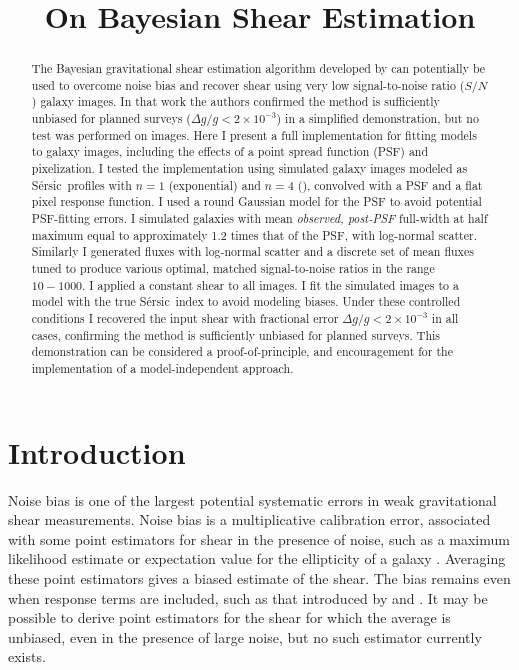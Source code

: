 \documentclass[12pt,preprint]{aastex}
\newcommand{\sn}{$S/N$}
\newcommand{\sersic}{S\'{e}rsic}
\begin{document}
\title{On Bayesian Shear Estimation}



\begin{abstract}

The Bayesian gravitational shear estimation algorithm developed by \cite{ba14}
can potentially be used to overcome noise bias and recover shear using very low
signal-to-noise ratio (\sn) galaxy images.  In that work the authors confirmed
the method is sufficiently unbiased for planned surveys ($\Delta g/g < 2 \times
10^{-3}$) in a simplified demonstration, but no test was performed on images.
Here I present a full implementation for fitting models to galaxy images,
including the effects of a point spread function (PSF) and pixelization.  I
tested the implementation using simulated galaxy images modeled as \sersic\
profiles with $n=1$ (exponential) and $n=4$ (\devauc), convolved with a PSF and
a flat pixel response function.  I used a round Gaussian model for the PSF to
avoid potential PSF-fitting errors. I simulated galaxies with mean {\it
observed, post-PSF} full-width at half maximum equal to approximately 1.2 times
that of the PSF, with log-normal scatter.  Similarly I generated fluxes with
log-normal scatter and a discrete set of mean fluxes tuned to produce various
optimal, matched signal-to-noise ratios in the range $10-1000$.  I applied a
constant shear to all images. I fit the simulated images to a model with the
true \sersic\ index to avoid modeling biases.   Under these controlled
conditions I recovered the input shear with fractional error $\Delta g/g < 2
\times 10^{-3}$ in all cases, confirming the method is sufficiently unbiased
for planned surveys.  This demonstration can be considered a
proof-of-principle, and encouragement for the implementation of a
model-independent approach.


\end{abstract}

\section{Introduction} \label{sec:intro}


Noise bias is one of the largest potential systematic errors in weak
gravitational shear measurements.  Noise bias is a multiplicative calibration
error, associated with some point estimators for shear in the presence of
noise, such as a maximum likelihood estimate or expectation value for the
ellipticity of a galaxy \citep{HirataAlign04,Refreg12,Melchior12,Miller13}.
Averaging these point estimators gives a biased estimate of the shear.  The
bias remains even when response terms are included, such as that introduced by
\cite{ksb95} and \cite{Bern02}. It may be possible to derive point estimators
for the shear for which the average is unbiased, even in the presence of large
noise, but no such estimator currently exists.
\end{document}
